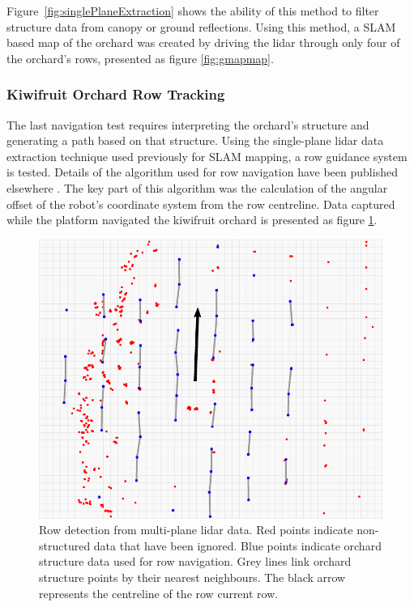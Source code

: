 \documentclass[preprint,authoryear,12pt]{elsarticle}
\begin{document}
        Figure~\ref{fig:singlePlaneExtraction} shows the ability of this method to filter structure data from canopy or ground reflections.
        Using this method, a SLAM based map of the orchard was created by driving the lidar through only four of the orchard's rows, presented as figure \ref{fig:gmapmap}.


    \subsubsection{Kiwifruit Orchard Row Tracking}
        \label{sect:row_tracking}

        The last navigation test requires interpreting the orchard's structure and generating a path based on that structure.
        Using the single-plane lidar data extraction technique used previously for SLAM mapping, a row guidance system is tested.
        Details of the algorithm used for row navigation have been published elsewhere \citep{Bell2016}.
        The key part of this algorithm was the calculation of the angular offset of the robot’s coordinate system from the row centreline.
        Data captured while the platform navigated the kiwifruit orchard is presented as figure \ref{fig:lastLidarFrame}.

        \begin{figure}[htb]
            \centering
            \includegraphics[width=\linewidth]{imgs/row_following/row_following_narrow.pdf}
            \caption{
                Row detection from multi-plane lidar data.
                Red points indicate non-structured data that have been ignored.
                Blue points indicate orchard structure data used for row navigation.
                Grey lines link orchard structure points by their nearest neighbours.
                The black arrow represents the centreline of the row current row.
            }
            \label{fig:lastLidarFrame}
        \end{figure}
\end{document}
